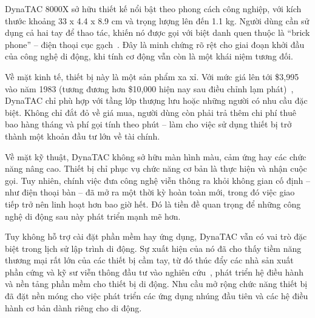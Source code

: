 \begin{flushleft}
  \hspace*{0.8cm}DynaTAC 8000X sở hữu thiết kế nổi bật theo phong cách công nghiệp, với kích thước khoảng 33 x 4.4 x 8.9 cm và trọng lượng lên đến 1.1 kg. Người dùng cần sử dụng cả hai tay để thao tác, khiến nó được gọi với biệt danh quen thuộc là “brick phone” – điện thoại cục gạch~\cite{brickphone}. Đây là minh chứng rõ rệt cho giai đoạn khởi đầu của công nghệ di động, khi tính cơ động vẫn còn là một khái niệm tương đối.
\end{flushleft}

\begin{flushleft}
  \hspace*{0.8cm}Về mặt kinh tế, thiết bị này là một sản phẩm xa xỉ. Với mức giá lên tới \$3,995 vào năm 1983 (tương đương hơn \$10,000 hiện nay sau điều chỉnh lạm phát)~\cite{dynatacprice}, DynaTAC chỉ phù hợp với tầng lớp thượng lưu hoặc những người có nhu cầu đặc biệt. Không chỉ đắt đỏ về giá mua, người dùng còn phải trả thêm chi phí thuê bao hàng tháng và phí gọi tính theo phút – làm cho việc sử dụng thiết bị trở thành một khoản đầu tư lớn về tài chính.
\end{flushleft}

\begin{flushleft}
  \hspace*{0.8cm}Về mặt kỹ thuật, DynaTAC không sở hữu màn hình màu, cảm ứng hay các chức năng nâng cao. Thiết bị chỉ phục vụ chức năng cơ bản là thực hiện và nhận cuộc gọi. Tuy nhiên, chính việc đưa công nghệ viễn thông ra khỏi không gian cố định – như điện thoại bàn – đã mở ra một thời kỳ hoàn toàn mới, trong đó việc giao tiếp trở nên linh hoạt hơn bao giờ hết. Đó là tiền đề quan trọng để những công nghệ di động sau này phát triển mạnh mẽ hơn.
\end{flushleft}

\begin{flushleft}
  \hspace*{0.8cm}Tuy không hỗ trợ cài đặt phần mềm hay ứng dụng, DynaTAC vẫn có vai trò đặc biệt trong lịch sử lập trình di động. Sự xuất hiện của nó đã cho thấy tiềm năng thương mại rất lớn của các thiết bị cầm tay, từ đó thúc đẩy các nhà sản xuất phần cứng và kỹ sư viễn thông đầu tư vào nghiên cứu~\cite{earlyos}, phát triển hệ điều hành và nền tảng phần mềm cho thiết bị di động. Nhu cầu mở rộng chức năng thiết bị đã đặt nền móng cho việc phát triển các ứng dụng nhúng đầu tiên và các hệ điều hành cơ bản dành riêng cho di động.
\end{flushleft}

